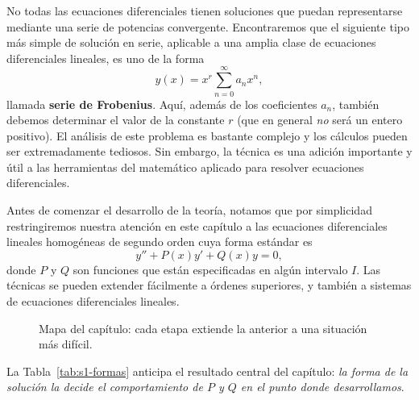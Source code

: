 No todas las ecuaciones diferenciales tienen soluciones que puedan representarse mediante una serie de potencias convergente. Encontraremos que el siguiente tipo más simple de solución en serie, aplicable a una amplia clase de ecuaciones diferenciales lineales, es uno de la forma
\[ y(x) = x^r \sum_{n=0}^{\infty} a_n x^n, \]
llamada \textbf{serie de Frobenius}. Aquí, además de los coeficientes $a_n$, también debemos determinar el valor de la constante $r$ (que en general \textit{no} será un entero positivo). El análisis de este problema es bastante complejo y los cálculos pueden ser extremadamente tediosos. Sin embargo, la técnica es una adición importante y útil a las herramientas del matemático aplicado para resolver ecuaciones diferenciales.
 
Antes de comenzar el desarrollo de la teoría, notamos que por simplicidad restringiremos nuestra atención en este capítulo a las ecuaciones diferenciales lineales homogéneas de segundo orden cuya forma estándar es
\[ y'' + P(x)y' + Q(x)y = 0, \]
donde $P$ y $Q$ son funciones que están especificadas en algún intervalo $I$. Las técnicas se pueden extender fácilmente a órdenes superiores, y también a sistemas de ecuaciones diferenciales lineales.
 
\begin{figure}[H]
\centering
{}
\caption{Mapa del capítulo: cada etapa extiende la anterior a una situación más difícil.}
\label{fig:s1-mapa}
\end{figure}
 
La Tabla~\ref{tab:s1-formas} anticipa el resultado central del capítulo: \emph{la forma de la solución la decide el comportamiento de $P$ y $Q$ en el punto donde desarrollamos}.
 

